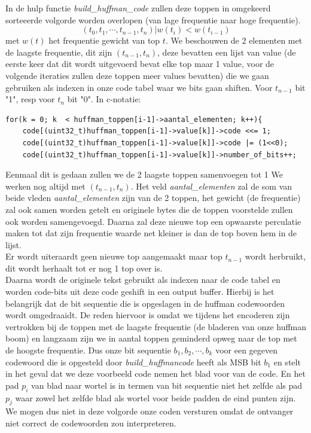 \documentclass[10pt,a4paper]{report}
\begin{document}
In de hulp functie \emph{build\_huffman\_code} zullen deze toppen in omgekeerd sorteeerde volgorde worden overlopen (van lage frequentie naar hoge frequentie). 
$$(t_{0},t_{1},\cdots,t_{n-1},t_{n}) | w(t_{i}) < w(t_{i-1})$$
met $w(t)$ het frequentie gewicht van top $t$. We beschouwen de 2 elementen met de laagste frequentie, dit zijn $(t_{n-1},t_{n})$, deze bevatten een lijst van value (de eerste keer dat dit wordt uitgevoerd bevat elke top maar 1 value, voor de volgende iteraties zullen deze toppen meer values bevatten) die we gaan gebruiken als indexen in onze code tabel waar we bits gaan shiften. Voor $t_{n-1}$ bit "1", resp voor $t_{n}$ bit "0". In c-notatie:
\begin{lstlisting}
for(k = 0; k  < huffman_toppen[i-1]->aantal_elementen; k++){       
	code[(uint32_t)huffman_toppen[i-1]->value[k]]->code <<= 1; 
	code[(uint32_t)huffman_toppen[i-1]->value[k]]->code |= (1<<0);
	code[(uint32_t)huffman_toppen[i-1]->value[k]]->number_of_bits++;
\end{lstlisting}

Eenmaal dit is gedaan zullen we de 2 laagste toppen samenvoegen tot 1
We werken nog altijd met $(t_{n-1},t_{n})$. Het veld \emph{aantal\_elementen} zal de som van beide vleden \emph{aantal\_elementen} zijn van de 2 toppen, het gewicht (de frequentie) zal ook samen worden getelt en originele bytes die de toppen voorstelde zullen ook worden samengevoegd. Daarna zal deze nieuwe top een opwaarste perculatie maken tot dat zijn frequentie waarde net kleiner is dan de top boven hem in de lijst.\\

Er wordt uiteraardt geen nieuwe top aangemaakt maar top $t_{n-1}$ wordt herbruikt, dit wordt herhaalt tot er nog 1 top over is. \\

Daarna wordt de originele tekst gebruikt als indexen naar de code tabel en worden code-bits uit deze code geshift in een output buffer. Hierbij is het belangrijk dat de bit sequentie die is opgeslagen in de huffman codewoorden wordt omgedraaidt. De reden hiervoor is omdat we tijdens het encoderen zijn vertrokken bij de toppen met de laagste frequentie (de bladeren van onze huffman boom) en langzaam zijn we in aantal toppen geminderd opweg naar de top met de hoogste frequentie. Dus onze bit sequentie $b_{1},b_{2},\cdots,b_{k}$ voor een gegeven codewoord die is opgesteld door \emph{build\_huffmancode} heeft als MSB bit $b_{1}$ en stelt in het geval dat we deze voorbeeld code nemen het blad voor van de code. En het pad $p_{i}$ van blad naar wortel is in termen van bit sequentie niet het zelfde als pad $p_{j}$ waar zowel het zelfde blad als wortel voor beide padden de eind punten zijn. We mogen dus niet in deze volgorde onze coden versturen omdat de ontvanger niet correct de codewoorden zou interpreteren. \\
\end{document}
